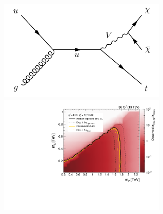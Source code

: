 \documentclass[aspectratio=169,xcolor=dvipsnames,,table,compress]{beamer}
\begin{document}
\begin{frame}[t]
\begin{columns}[T]
\begin{column}{0.5\textwidth}
        \includegraphics[width=0.6\textwidth]{../figures/monotop/diagrams/fcncb.pdf} \\ 
        \includegraphics[width=0.6\textwidth]{../figures/monotop/results/fcnc2d_obs_vector.pdf}
    \end{column}
  \end{columns}
\end{frame}
\end{document}
